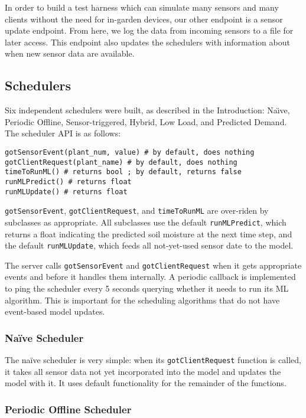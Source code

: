 \documentclass[a4paper]{acm_proc_article-sp}
\begin{document}
In order to build a test harness which can simulate many sensors and many clients without the need for in-garden devices, our other endpoint is a sensor update endpoint.  From here, we log the data from incoming sensors to a file for later access.  This endpoint also updates the schedulers with information about when new sensor data are available.

\subsection{Schedulers}

Six independent schedulers were built, as described in the Introduction: Na\"{\i}ve, Periodic Offline, Sensor-triggered, Hybrid, Low Load, and Predicted Demand.  The scheduler API is as follows:

\begin{lstlisting}
gotSensorEvent(plant_num, value) # by default, does nothing
gotClientRequest(plant_name) # by default, does nothing
timeToRunML() # returns bool ; by default, returns false
runMLPredict() # returns float
runMLUpdate() # returns float
\end{lstlisting}

\lstinline|gotSensorEvent|, \lstinline|gotClientRequest|, and \lstinline|timeToRunML| are over-riden by subclasses as appropriate.  All subclasses use the default \lstinline|runMLPredict|, which returns a float indicating the predicted soil moisture at the next time step, and the default \lstinline|runMLUpdate|, which feeds all not-yet-used sensor date to the model.

The server calls \lstinline|gotSensorEvent| and \lstinline|gotClientRequest| when it gets appropriate events and before it handles them internally.  A periodic callback is implemented to ping the scheduler every 5 seconds querying whether it needs to run its ML algorithm.  This is important for the scheduling algorithms that do not have event-based model updates.

\subsubsection{Na\"{i}ve Scheduler}

The na\"{i}ve scheduler is very simple: when its \lstinline|gotClientRequest| function is called, it takes all sensor data not yet incorporated into the model and updates the model with it.  It uses default functionality for the remainder of the functions.

\subsubsection{Periodic Offline Scheduler}
\end{document}
